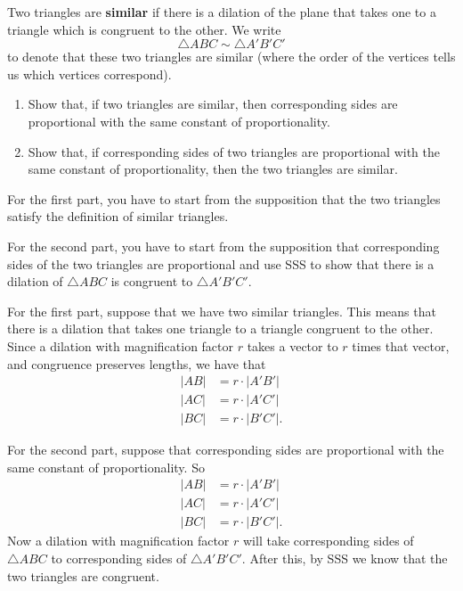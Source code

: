 \documentclass{ximera}
\begin{document}
\begin{definition}
Two triangles are \textbf{similar} if there is a dilation of the
plane that takes one to a triangle which is congruent to the other. We write%
\[
\triangle ABC\sim\triangle A'B'C'%
\]
to denote that these two triangles are similar (where the order of the
vertices tells us which vertices correspond).
\end{definition}

\begin{question}\hfil
\begin{enumerate}
\item Show that, if two triangles are similar, then corresponding
sides are proportional with the same constant of proportionality.

\item Show that, if corresponding sides of two triangles are
  proportional with the same constant of proportionality, then the two
  triangles are similar.


\end{enumerate}
\begin{solution}
\begin{hint}
For the first part, you have to start from the supposition that the
two triangles satisfy the definition of similar triangles.
\end{hint}
\begin{hint}
For the second part, you have to start from the supposition that
corresponding sides of the two triangles are proportional and use SSS
to show that there is a dilation of $\triangle ABC$ is congruent to
$\triangle A'B'C'$.
\end{hint}
For the first part, suppose that we have two similar triangles. This
means that there is a dilation that takes one triangle to a triangle
congruent to the other. Since a dilation with magnification factor
$r$ takes a vector to $r$ times that vector, and congruence preserves
lengths, we have that
\begin{align*}
|AB| &= r\cdot |A'B'|\\
|AC| &= r\cdot |A'C'|\\
|BC| &= r\cdot |B'C'|.
\end{align*}


For the second part, suppose that corresponding sides are proportional
with the same constant of proportionality. So
\begin{align*}
|AB| &= r\cdot |A'B'|\\
|AC| &= r\cdot |A'C'|\\
|BC| &= r\cdot |B'C'|.
\end{align*}
Now a dilation with magnification factor $r$ will take corresponding
sides of $\triangle ABC$ to corresponding sides of $\triangle
A'B'C'$. After this, by SSS we know that the two triangles are
congruent.
\end{solution}
\end{question}
\end{document}

